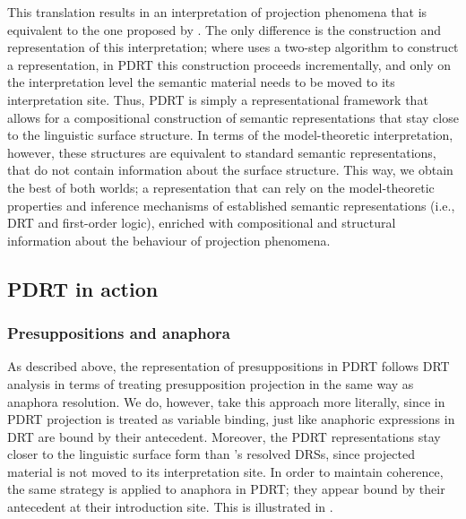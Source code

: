 This translation results in an interpretation of projection phenomena that
is equivalent to the one proposed by \citet{sandt1992presupposition}. The
only difference is the construction and representation of this
interpretation; where \citeauthor{sandt1992presupposition} uses a two-step
algorithm to construct a representation, in PDRT this construction proceeds
incrementally, and only on the interpretation level the semantic material
needs to be moved to its interpretation site.  Thus, PDRT is simply
a representational framework that allows for a compositional construction of
semantic representations that stay close to the linguistic surface
structure. In terms of the model-theoretic interpretation, however, these
structures are equivalent to standard semantic representations, that do not
contain information about the surface structure. This way, we obtain the
best of both worlds; a representation that can rely on the model-theoretic
properties and inference mechanisms of established semantic representations
(i.e., DRT and first-order logic), enriched with compositional and
structural information about the behaviour of projection phenomena.

\subsection{PDRT in action}

\subsubsection{Presuppositions and anaphora}

As described above, the representation of presuppositions in PDRT follows
\cites{sandt1992presupposition} DRT analysis in terms of treating
presupposition projection in the same way as anaphora resolution. We do,
however, take this approach more literally, since in PDRT projection is
treated as variable binding, just like anaphoric expressions in DRT are
bound by their antecedent. Moreover, the PDRT representations stay closer to
the linguistic surface form than \citeauthor{sandt1992presupposition}'s
resolved DRSs, since projected material is not moved to its interpretation
site. In order to maintain coherence, the same strategy is applied to
anaphora in PDRT; they appear bound by their antecedent at their
introduction site. This is illustrated in \Next.

